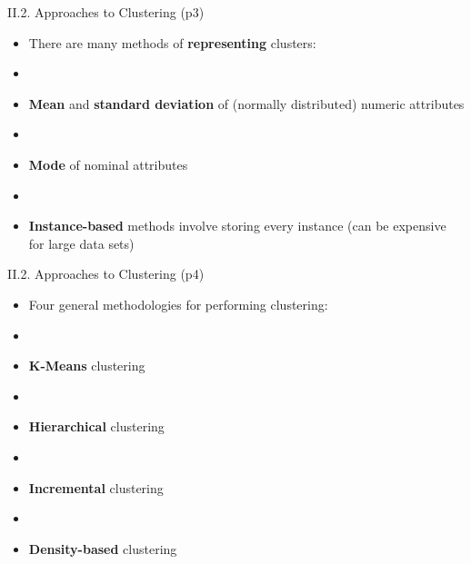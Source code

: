\documentclass[handout]{beamer}
\newcommand{\strong}[1]{\textbf{\color{teal} #1}}
\newcommand{\stronger}[1]{\textbf{\color{purple} #1}}
\begin{document}
\begin{frame}{II.2. Approaches to Clustering (p3)}
\begin{itemize}
\item There are many methods of \strong{representing} clusters:
\item[]
\item[--] \strong{Mean} and \strong{standard deviation} of (normally distributed) numeric attributes
\item[]
\item[--] \strong{Mode} of nominal attributes
\item[]
\item[--] \stronger{Instance-based} methods involve storing every instance (can be expensive for large data sets)
\end{itemize}
\end{frame}
\begin{frame}{II.2. Approaches to Clustering (p4)}
\begin{itemize}
\item[] Four general methodologies for performing clustering:
\item[]
\item[II.2.1.] \stronger{K-Means} clustering
\item[]
\item[II.2.2.] \strong{Hierarchical} clustering
\item[]
\item[II.2.3.] \strong{Incremental} clustering
\item[]
\item[II.2.4.] \strong{Density-based} clustering
\end{itemize}
\end{frame}
\end{document}
